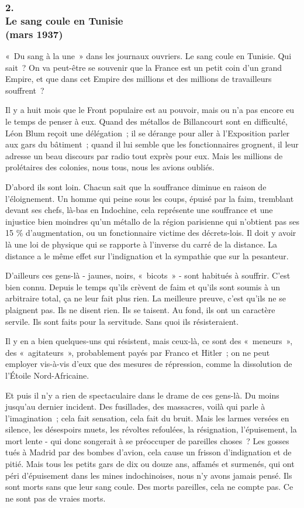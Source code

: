 \documentclass[french,twoside]{book} %
\begin{document}
\subsubsection[2. Le sang coule en Tunisie, (mars 1937)]{2. \\
Le sang coule en Tunisie \\
(mars 1937)}
\noindent \par
« Du sang à la une » dans les journaux ouvriers. Le sang coule en Tunisie. Qui sait ? On va peut-être se souvenir que la France est un petit coin d'un grand Empire, et que dans cet Empire des millions et des millions de travailleurs souffrent ?\par
Il y a huit mois que le Front populaire est au pouvoir, mais ou n'a pas encore eu le temps de penser à eux. Quand des métallos de Billancourt sont en difficulté, Léon Blum reçoit une délégation ; il se dérange pour aller à l'Exposition parler aux gars du bâtiment ; quand il lui semble que les fonctionnaires grognent, il leur adresse un beau discours par radio tout exprès pour eux. Mais les millions de prolétaires des colonies, nous tous, nous les avions oubliés.\par
D'abord ils sont loin. Chacun sait que la souffrance diminue en raison de l'éloignement. Un homme qui peine sous les coups, épuisé par la faim, tremblant devant ses chefs, là-bas en Indochine, cela représente une souf­france et une injustice bien moindres qu'un métallo de la région parisienne qui n'obtient pas ses 15 \% d'augmentation, ou un fonctionnaire victime des décrets-lois. Il doit y avoir là une loi de physique qui se rapporte à l'inverse du carré de la distance. La distance a le même effet sur l'indignation et la sympa­thie que sur la pesanteur.\par
D'ailleurs ces gens-là - jaunes, noirs, « bicots » - sont habitués à souffrir. C'est bien connu. Depuis le temps qu'ils crèvent de faim et qu'ils sont soumis à un arbitraire total, ça ne leur fait plus rien. La meilleure preuve, c'est qu'ils ne se plaignent pas. Ils ne disent rien. Ils se taisent. Au fond, ils ont un caractère servile. Ils sont faits pour la servitude. Sans quoi ils résisteraient.\par
Il y en a bien quelques-uns qui résistent, mais ceux-là, ce sont des « meneurs », des « agitateurs », probablement payés par Franco et Hitler ; on ne peut employer vis-à-vis d'eux que des mesures de répression, comme la dissolution de l'Étoile Nord-Africaine.\par
Et puis il n'y a rien de spectaculaire dans le drame de ces gens-là. Du moins jusqu'au dernier incident. Des fusillades, des massacres, voilà qui parle à l'imagination ; cela fait sensation, cela fait du bruit. Mais les larmes versées en silence, les désespoirs muets, les révoltes refoulées, la résignation, l'épuisement, la mort lente - qui donc songerait à se préoccuper de pareilles choses ? Les gosses tués à Madrid par des bombes d'avion, cela cause un frisson d'indignation et de pitié. Mais tous les petits gars de dix ou douze ans, affamés et surmenés, qui ont péri d'épuisement dans les mines indochinoises, nous n'y avons jamais pensé. Ils sont morts sans que leur sang coule. Des morts pareilles, cela ne compte pas. Ce ne sont pas de vraies morts.\par
\end{document}
